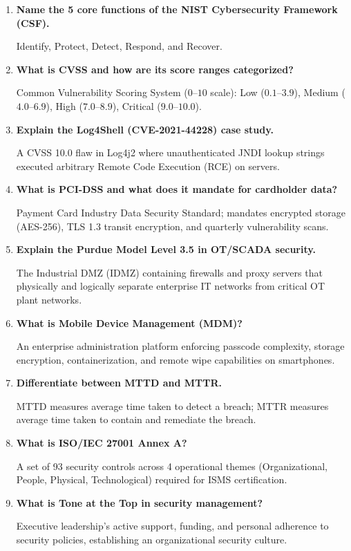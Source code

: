 \documentclass[12pt,a4paper]{article}
\newcommand{\Q}[1]{\textbf{#1}\par\noindent\ignorespaces}
\begin{document}
\begin{tcolorbox}[exambox, title={\textbf{Frequently Asked / Viva Questions}}]
\begin{enumerate}[leftmargin=*, label=\textbf{Q\arabic*.}, itemsep=5pt, topsep=0pt]
  \item \Q{Name the 5 core functions of the NIST Cybersecurity Framework (CSF).}
        Identify, Protect, Detect, Respond, and Recover.

  \item \Q{What is CVSS and how are its score ranges categorized?}
        Common Vulnerability Scoring System ($0\text{--}10$ scale): Low ($0.1\text{--}3.9$), Medium ($4.0\text{--}6.9$), High ($7.0\text{--}8.9$), Critical ($9.0\text{--}10.0$).

  \item \Q{Explain the Log4Shell (CVE-2021-44228) case study.}
        A CVSS 10.0 flaw in Log4j2 where unauthenticated JNDI lookup strings executed arbitrary Remote Code Execution (RCE) on servers.

  \item \Q{What is PCI-DSS and what does it mandate for cardholder data?}
        Payment Card Industry Data Security Standard; mandates encrypted storage (AES-256), TLS 1.3 transit encryption, and quarterly vulnerability scans.

  \item \Q{Explain the Purdue Model Level 3.5 in OT/SCADA security.}
        The Industrial DMZ (IDMZ) containing firewalls and proxy servers that physically and logically separate enterprise IT networks from critical OT plant networks.

  \item \Q{What is Mobile Device Management (MDM)?}
        An enterprise administration platform enforcing passcode complexity, storage encryption, containerization, and remote wipe capabilities on smartphones.

  \item \Q{Differentiate between MTTD and MTTR.}
        MTTD measures average time taken to detect a breach; MTTR measures average time taken to contain and remediate the breach.

  \item \Q{What is ISO/IEC 27001 Annex A?}
        A set of 93 security controls across 4 operational themes (Organizational, People, Physical, Technological) required for ISMS certification.

  \item \Q{What is Tone at the Top in security management?}
        Executive leadership's active support, funding, and personal adherence to security policies, establishing an organizational security culture.


\end{enumerate}
\end{tcolorbox}
\end{document}
